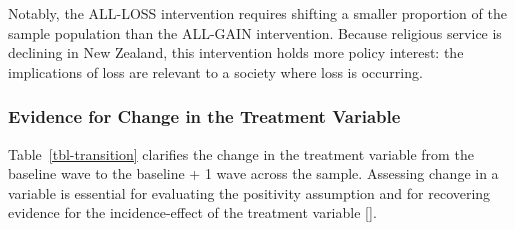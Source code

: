\documentclass[
  single column]{article}
\begin{document}
Notably, the ALL-LOSS intervention requires shifting a smaller
proportion of the sample population than the ALL-GAIN intervention.
Because religious service is declining in New Zealand, this intervention
holds more policy interest: the implications of loss are relevant to a
society where loss is occurring.

\subsubsection{Evidence for Change in the Treatment
Variable}\label{evidence-for-change-in-the-treatment-variable}

Table~\ref{tbl-transition} clarifies the change in the treatment
variable from the baseline wave to the baseline + 1 wave across the
sample. Assessing change in a variable is essential for evaluating the
positivity assumption and for recovering evidence for the
incidence-effect of the treatment variable {[}{]}.

\begin{table}

\caption{\label{tbl-placeholder}}

\centering{

\captionsetup{labelsep=none}

}

\end{table}%
\end{document}
